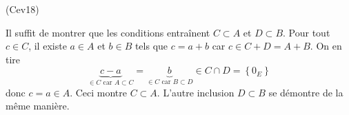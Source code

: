 \begin{tiny}(Cev18)\end{tiny} Il suffit de montrer que les conditions entraînent $C\subset A$ et $D\subset B$.\newline
Pour tout $c\in C$, il existe $a\in A$ et $b\in B$ tels que $c = a+b$ car $c\in C+D =A+B$. On en tire 
\begin{displaymath}
  \underset{\in C \text{ car } A\subset C}{\underbrace{c-a}} = \underset{\in C \text{ car } B\subset D}{\underbrace{b}} \in C \cap D = \left\lbrace 0_E \right\rbrace 
\end{displaymath}
donc $c=a\in A$. Ceci montre $C\subset A$. L'autre inclusion $D \subset B$ se démontre de la même manière.